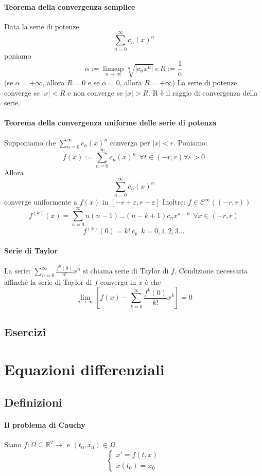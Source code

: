 \documentclass[a4paper,12pt]{article}
\newcommand{\cont}{\mathscr{C}}
\begin{document}
\paragraph{Teorema della convergenza semplice}
Data la serie di potenze 
$$ \displaystyle \sum_{n=0}^\infty c_n\left(x\right)^n$$
poniamo $$ \alpha:=\limsup_{n\to \infty} \sqrt[n]{|c_n x^n|} \ e \ R:=\frac{1}{\alpha}$$
(se $\alpha = +\infty$, allora $R=0$ e se $\alpha=0$, allora $R=+\infty$)
La serie di potenze converge se $|x|<R$ e non converge se $|x|>R$.
R è il raggio di convergenza della serie.
\paragraph{Teorema della convergenza uniforme delle serie di potenza}
Supponiamo che $ \displaystyle \sum_{n=0}^\infty c_n\left(x\right)^n$ converga per $|x|<r$. Poniamo:
$$ f(x):= \displaystyle \sum_{n=0}^\infty c_n\left(x\right)^n \ \ \forall t \in (-r,r) \forall \varepsilon > 0 $$
Allora $$ \displaystyle \sum_{n=0}^\infty c_n\left(x\right)^n$$ converge uniformente a $f(x)$ in $[-r+\varepsilon,r-\varepsilon]$ Inoltre: $f \in \cont^\infty((-r,r))$ $$f^{(k)}(x) = \displaystyle \sum_{n=0}^\infty n(n-1)\dots(n-k+1)c_n x^{n-k} \ \ \forall x \in (-r,r)$$  $$f^{(k)}(0) = k!\ c_k \ \ k=0,1,2,3 \dots $$ 

\paragraph{Serie di Taylor}
La serie:
$\displaystyle \sum_{n=0}^\infty \frac{f^{n}(0)}{n!} x^n$ si chiama serie di Taylor di $f$. Condizione necessaria affinchè la serie di Taylor di $f$ converga in  $x$ è che $$\lim_{n \to \infty}\displaystyle \left[ f(x) - \displaystyle  \sum_{k=0}^\infty \frac{f^{k}(0)}{k!}x^k \right] = 0 $$
\subsection{Esercizi}

\section{Equazioni differenziali}

\subsection{Definizioni}
\paragraph{Il problema di Cauchy}
Siano $f:\Omega \subseteq \mathbb{R}^2 \longrightarrow $ e $ \left(t_0,x_0\right) \in \Omega.$ 
$$\label{PC}\begin{cases} x'=f\left(t,x\right) \\ x\left(t_0\right)=x_0 \end{cases}$$
\end{document}
